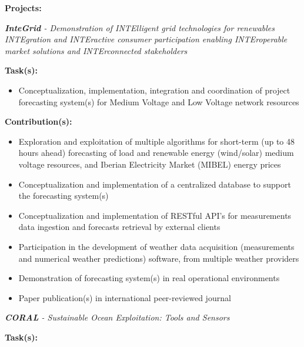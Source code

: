 \documentclass{mycv}
\begin{document}
\vspace{0.4cm}

\textbf{Projects:}

\begin{myitemize}	
	\item \textit{\textbf{InteGrid} - Demonstration of INTElligent grid technologies for renewables INTEgration and INTEractive consumer participation enabling INTEroperable market solutions and INTErconnected stakeholders}
	
		\vspace{0.4cm}
		\textbf{Task(s):}
		
		\begin{itemize}[itemsep=1px]
		\item Conceptualization, implementation, integration and coordination of project forecasting system(s) for Medium Voltage and Low Voltage network resources
		\end{itemize}
	
		\vspace{0.2cm}
		\textbf{Contribution(s):}
		
		\begin{itemize}[itemsep=1px]
		\item Exploration and exploitation of multiple algorithms for short-term (up to 48 hours ahead) forecasting of load and renewable energy (wind/solar) medium voltage resources, and Iberian Electricity Market (MIBEL) energy prices
		\item Conceptualization and implementation of a centralized database to support the forecasting system(s)
		\item Conceptualization and implementation of RESTful API's for measurements data ingestion and forecasts retrieval by external clients
		\item Participation in the development of weather data acquisition (measurements and numerical weather predictions) software, from multiple weather providers
		\item Demonstration of forecasting system(s) in real operational environments
		\item Paper publication(s) in international peer-reviewed journal
		\end{itemize}
	
	
	\vspace{0.6cm}	
	
	\item \textit{\textbf{CORAL} - Sustainable Ocean Exploitation: Tools and Sensors}

		\vspace{0.4cm}
		\textbf{Task(s):}


\end{myitemize}
\end{document}

